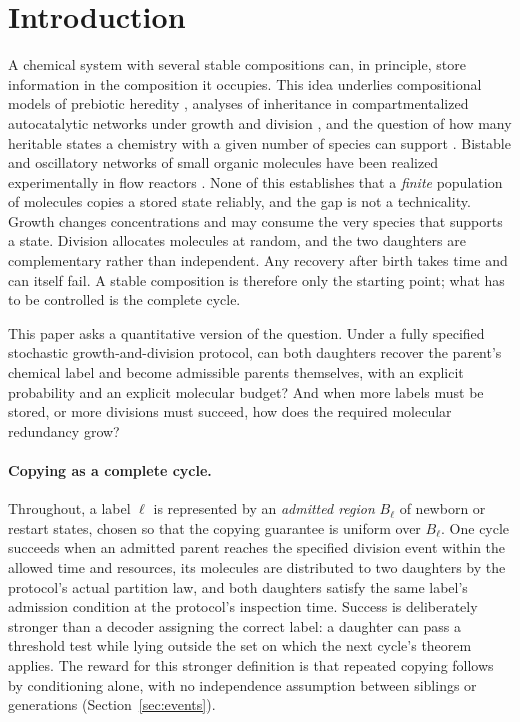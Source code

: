 \section{Introduction}\label{sec:intro}

A chemical system with several stable compositions can, in principle, store information in the composition it occupies. This idea underlies compositional models of prebiotic heredity \citep{segre2000,vasas2012}, analyses of inheritance in compartmentalized autocatalytic networks under growth and division \citep{matsubara2026,singh2023}, and the question of how many heritable states a chemistry with a given number of species can support \citep{virgo2015}. Bistable and oscillatory networks of small organic molecules have been realized experimentally in flow reactors \citep{semenov2016}. None of this establishes that a \emph{finite} population of molecules copies a stored state reliably, and the gap is not a technicality. Growth changes concentrations and may consume the very species that supports a state. Division allocates molecules at random, and the two daughters are complementary rather than independent. Any recovery after birth takes time and can itself fail. A stable composition is therefore only the starting point; what has to be controlled is the complete cycle.

This paper asks a quantitative version of the question. Under a fully specified stochastic growth-and-division protocol, can both daughters recover the parent's chemical label and become admissible parents themselves, with an explicit probability and an explicit molecular budget? And when more labels must be stored, or more divisions must succeed, how does the required molecular redundancy grow?

\paragraph{Copying as a complete cycle.}
Throughout, a label $\ell$ is represented by an \emph{admitted region} $B_\ell$ of newborn or restart states, chosen so that the copying guarantee is uniform over $B_\ell$. One cycle succeeds when an admitted parent reaches the specified division event within the allowed time and resources, its molecules are distributed to two daughters by the protocol's actual partition law, and both daughters satisfy the same label's admission condition at the protocol's inspection time. Success is deliberately stronger than a decoder assigning the correct label: a daughter can pass a threshold test while lying outside the set on which the next cycle's theorem applies. The reward for this stronger definition is that repeated copying follows by conditioning alone, with no independence assumption between siblings or generations (Section~\ref{sec:events}).


